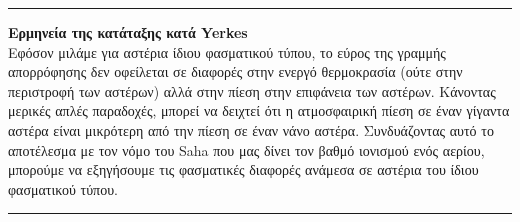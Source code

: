 \vspace{0.5cm}
{\color{red} \hrule}
\textbf{Ερμηνεία της κατάταξης κατά Yerkes}\\
Εφόσον μιλάμε για αστέρια ίδιου φασματικού τύπου, το εύρος της γραμμής απορρόφησης δεν οφείλεται σε διαφορές στην ενεργό θερμοκρασία (ούτε στην περιστροφή των αστέρων) αλλά στην πίεση στην επιφάνεια των αστέρων. Κάνοντας μερικές απλές παραδοχές, μπορεί να δειχτεί ότι η ατμοσφαιρική πίεση σε έναν γίγαντα αστέρα είναι μικρότερη από την πίεση σε έναν νάνο αστέρα. Συνδυάζοντας αυτό το αποτέλεσμα με τον νόμο του Saha που μας δίνει τον βαθμό ιονισμού ενός αερίου, μπορούμε να εξηγήσουμε τις φασματικές διαφορές ανάμεσα σε αστέρια του ίδιου φασματικού τύπου.\\
{\color{red} \hrule}

